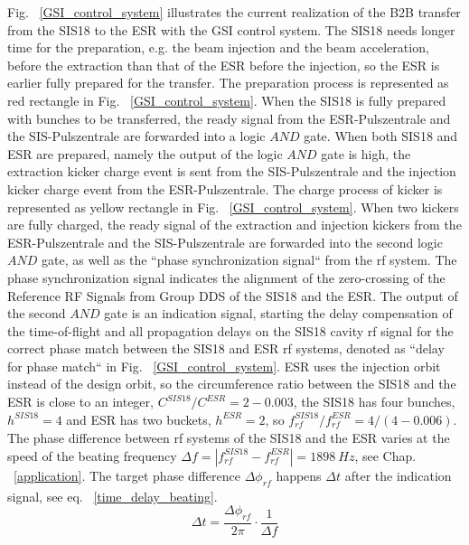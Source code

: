 Fig. ~\ref{GSI_control_system} illustrates the current realization of the B2B transfer from the SIS18 to the ESR with the GSI control system. The SIS18 needs longer time for the preparation, e.g. the beam injection and the beam acceleration, before the extraction than that of the ESR before the injection, so the ESR is earlier fully prepared for the transfer. The preparation process is represented as red rectangle in Fig. ~\ref{GSI_control_system}. When the SIS18 is fully prepared with bunches to be transferred, the ready signal from the ESR-Pulszentrale and the SIS-Pulszentrale are forwarded into a logic $\textit{AND}$ gate. When both SIS18 and ESR are prepared, namely the output of the logic $\textit{AND}$ gate is high, the extraction kicker charge event is sent from the SIS-Pulszentrale and the injection kicker charge event from the ESR-Pulszentrale. The charge process of kicker is represented as yellow rectangle in Fig. ~\ref{GSI_control_system}. When two kickers are fully charged, the ready signal of the extraction and injection kickers from the ESR-Pulszentrale and the SIS-Pulszentrale are forwarded into the second logic $\textit{AND}$ gate, as well as the ``phase synchronization signal`` from the rf system. The phase synchronization signal indicates the alignment of the zero-crossing of the Reference RF Signals from Group DDS of the SIS18 and the ESR. The output of the second $\textit{AND}$ gate is an indication signal, starting the delay compensation of the time-of-flight and all propagation delays on the SIS18 cavity rf signal for the correct phase match between the SIS18 and ESR rf systems, denoted as ``delay for phase match`` in Fig. ~\ref{GSI_control_system}. ESR uses the injection orbit instead of the design orbit, so the circumference ratio between the SIS18 and the ESR is close to an integer, $C^{\mathit{SIS18}}/C^{\mathit{ESR}}=2-0.003$, the SIS18 has four bunches, $h^{\mathit{SIS18}}=4$ and ESR has two buckets, $h^{\mathit{ESR}}=2$, so $f^{\mathit{SIS18}}_{\mathit{rf}}/f^{\mathit{ESR}}_{\mathit{rf}}=4/(4-0.006)$. The phase difference between rf systems of the SIS18 and the ESR varies at the speed of the beating frequency $\Delta f=|f^{\mathit{SIS18}}_{\mathit{rf}}-f^{\mathit{ESR}}_{\mathit{rf}}|=\SI{1898}{Hz}$, see Chap. ~\ref{application}. The target phase difference $\Delta\phi_\mathit{rf}$ happens $\Delta t$ after the indication signal, see eq. ~\ref{time_delay_beating}. 
\begin{equation}
\Delta t= \frac{\Delta \phi_\mathit{rf}}{2\pi}\cdot\frac{1}{\Delta f}\label{time_delay_beating}
\end{equation}

